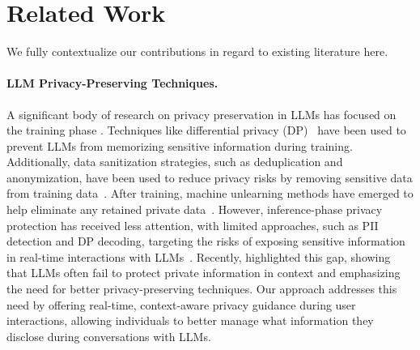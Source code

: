 \section{Related Work}
\label{sec:relatedwork}
We fully contextualize our contributions in regard to existing literature here.

\paragraph{LLM Privacy-Preserving Techniques.}
A significant body of research on privacy preservation in LLMs has focused on the training phase \citep{zhang2024dpzero,chua2024mind,yu2021differentially,yue2022synthetic,li2021large}. Techniques like differential privacy (DP)~\citep{dwork2006calibrating} have been used to prevent LLMs from memorizing sensitive information during training. Additionally, data sanitization strategies, such as deduplication and anonymization, have been used to reduce privacy risks by removing sensitive data from training data~\citep{lison2021anonymisation, kandpal2022deduplicating}. After training, machine unlearning methods have emerged to help eliminate any retained private data~\citep{carlini2019secret, biderman2024emergent, mccoy2023much, zhang2023counterfactual, carlini2021extracting, nasr2023scalable, xu2024machine}. However, inference-phase privacy protection has received less attention, with limited approaches, such as PII detection and DP decoding, targeting the risks of exposing sensitive information in real-time interactions with LLMs~\citep{majmudar2022differentially,carey2024dp,wu2023privacy,tang2023privacy,hong2023dp,edemacu2024privacy}. Recently, \citet{mireshghallah2023can} highlighted this gap, showing that LLMs often fail to protect private information in context and emphasizing the need for better privacy-preserving techniques. Our approach addresses this need by offering real-time, context-aware privacy guidance during user interactions, allowing individuals to better manage what information they disclose during conversations with LLMs.


